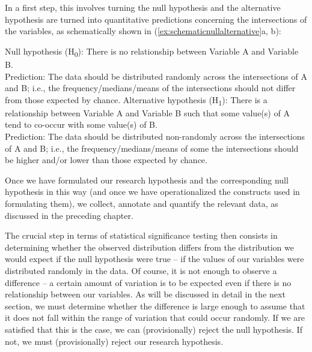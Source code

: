 In a first step, this involves turning the null hypothesis  and the alternative hypothesis are turned into quantitative  predictions concerning the intersections of the variables, as schematically shown in (\ref{ex:schematicnullalternative}a, b):

\begin{exe}
\ex
\begin{xlist}
\label{ex:schematicnullalternative}
\ex Null hypothesis  (H\textsubscript{0}): There is no relationship between Variable A and Variable B. \\[1.5ex]
Prediction: The data should be distributed  randomly  across the intersections of A and B; i.e., the frequency\slash medians\slash means  of the intersections should not differ from those expected  by  chance.
\ex Alternative hypothesis (H\textsubscript{1}): There is a relationship between Variable A and Variable B such that some value(s) of A tend to co\hyp{}occur with some value(s) of B. \\[1.5ex]
Prediction: The data should be distributed  non\hyp{}randomly  across the intersections of A and B; i.e., the frequency\slash medians\slash means  of some the intersections should be higher and\slash or lower than those expected  by  chance.
\end{xlist}
\end{exe}

Once we have formulated our research hypothesis and the corresponding null hypothesis  in this way (and once we have operationalized  the constructs used in formulating them), we collect, annotate  and quantify  the relevant data, as discussed in the preceding chapter.

The crucial step in terms of statistical significance  testing then consists in determining whether the observed distribution  differs from the distribution we would expect if the null hypothesis  were true -- if the values of our variables were distributed randomly  in the data. Of course, it is not enough to observe a difference -- a certain amount of variation  is to be expected  even if there is no relationship between our variables. As will be discussed in detail in the next section, we must determine whether the difference is large enough to assume that it does not fall within the range of variation that could occur randomly.  If we are satisfied that this is the case, we can (provisionally) reject the null hypothesis.  If not, we must (provisionally) reject our research hypothesis.

